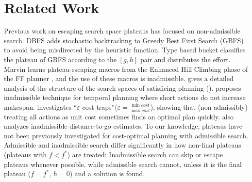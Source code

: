 \section{Related Work}
\label{sec-4}

Previous work on escaping search space plateaus has focused on
non-admissible search.  DBFS \cite{imai2011novel} %
adds stochastic backtracking to Greedy Best First Search (GBFS) to avoid
being misdirected by the heuristic function. Type based bucket
\cite{xie14type} classifies the plateau of GBFS according to the
$[g,h]$ pair and distributes the effort.  Marvin \cite{Coles07} learns plateau-escaping macros
from the Enhanced Hill Climbing phase of the FF planner
\cite{Hoffmann01}, and the use of these macros is inadmissible.
\citeauthor{Hoffmann05} gives a detailed analysis of the
structure of the search spaces of satisficing planning (\citeyear{Hoffmann05,Hoffmann11}).
\cite{benton2010g} proposes inadmissible technique for temporal planning
where short actions 
do not increase makespan. 
\cite{cushing2010cost} investigates ``$\varepsilon$-cost
traps''($\varepsilon=\frac{\min cost}{\max cost}$),  showing that (non-admissibly) treating all actions as unit cost sometimes finds an optimal plan quickly.
\cite{wilt2011cost} also analyzes inadmissible distance-to-go estimates.
% 
To our knowledge, 
plateaus have not been previously investigated for cost-optimal planning with admissible search.
Admissible and inadmissible search differ significantly in how non-final plateaus (plateaus with $f < f^*$) are treated:
Inadmissible search can skip or escape plateaus whenever possible, while
admissible search cannot, unless it
is the final plateau ($f=f^*$, $h=0$) and a solution is found. %



